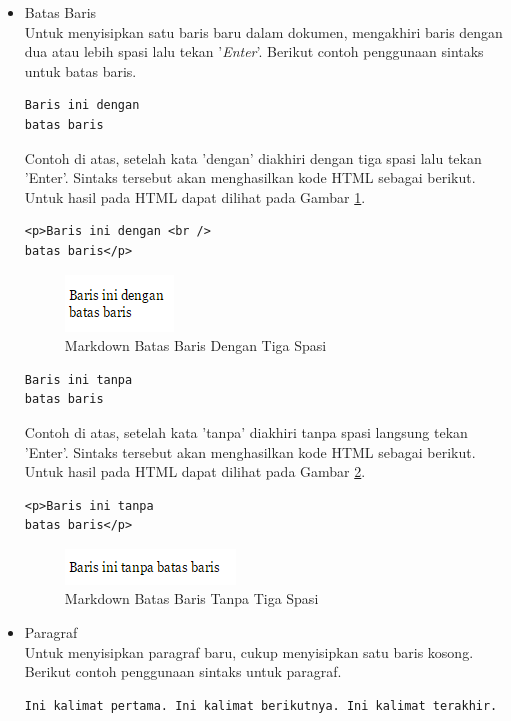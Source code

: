 \begin{itemize}
\begin{itemize}
\begin{itemize}
\item Batas Baris\\
Untuk menyisipkan satu baris baru dalam dokumen, mengakhiri baris dengan dua
atau lebih spasi lalu tekan '{\it Enter}'. Berikut contoh penggunaan sintaks
untuk batas baris.
\begin{lstlisting}[basicstyle=\footnotesize]
Baris ini dengan   
batas baris
\end{lstlisting}
Contoh di atas, setelah kata 'dengan' diakhiri dengan tiga spasi lalu tekan
'Enter'. Sintaks tersebut akan menghasilkan kode HTML sebagai berikut. Untuk
hasil pada HTML dapat dilihat pada Gambar \ref{fig:dengan}.
\begin{lstlisting}[basicstyle=\footnotesize]
<p>Baris ini dengan <br />
batas baris</p>
\end{lstlisting}
\begin{figure}[H]
\centering
\includegraphics[scale=1]{Gambar/dengan.png}
\caption[Markdown Batas Baris Dengan Tiga Spasi]{Markdown Batas Baris
Dengan Tiga Spasi}
\label{fig:dengan}
\end{figure}
\begin{lstlisting}[basicstyle=\footnotesize]
Baris ini tanpa
batas baris
\end{lstlisting}
Contoh di atas, setelah kata 'tanpa' diakhiri tanpa spasi langsung tekan
'Enter'. Sintaks tersebut akan menghasilkan kode HTML sebagai berikut. Untuk
hasil pada HTML dapat dilihat pada Gambar \ref{fig:tanpa}.
\begin{lstlisting}[basicstyle=\footnotesize]
<p>Baris ini tanpa
batas baris</p>
\end{lstlisting}
\begin{figure}[H]
\centering
\includegraphics[scale=1]{Gambar/tanpa.png}
\caption[Markdown Batas Baris Tanpa Tiga Spasi]{Markdown Batas Baris
Tanpa Tiga Spasi}
\label{fig:tanpa}
\end{figure}

\item Paragraf\\
Untuk menyisipkan paragraf baru, cukup menyisipkan satu baris kosong. Berikut
contoh penggunaan sintaks untuk paragraf.
\begin{lstlisting}[basicstyle=\footnotesize]
Ini kalimat pertama. Ini kalimat berikutnya. Ini kalimat terakhir.


\end{lstlisting}
\end{itemize}
\end{itemize}
\end{itemize}

